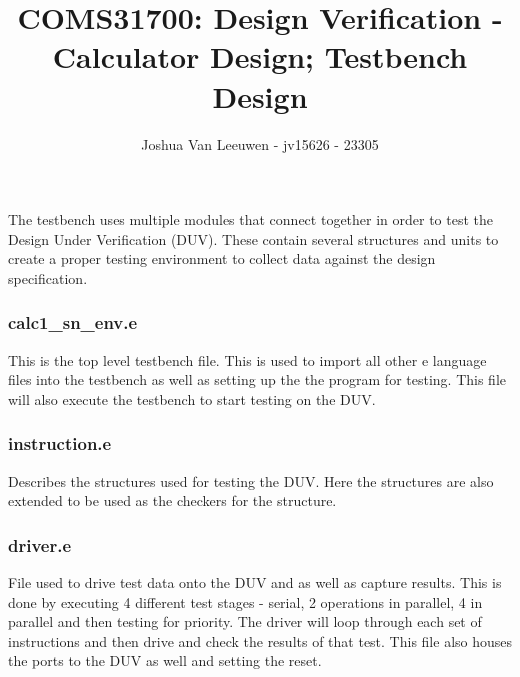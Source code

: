 \documentclass[a4paper]{article}
\title{\vspace{-0.7em}COMS31700: Design Verification - Calculator Design; Testbench Design\vspace{-0.7em}}
\author{Joshua Van Leeuwen - jv15626 - 23305}
\date{}
\begin{document}
\vspace{-10em}
\maketitle

\vspace{-4.1em}
The testbench uses multiple modules that connect together in order to test the
Design Under Verification (DUV). These contain several structures and units to
create a proper testing environment to collect data against the design
specification.


\subsubsection*{calc1\_sn\_env.e}
\vspace{-0.7em}
This is the top level testbench file. This is used to import all other e
language files into the testbench as well as setting up the the program for
testing. This file will also execute the testbench to start testing on the DUV.

\subsubsection*{instruction.e}
\vspace{-0.7em}
Describes the structures used for testing the DUV. Here the structures are also
extended to be used as the checkers for the structure.

\subsubsection*{driver.e}
\vspace{-0.7em}
File used to drive test data onto the DUV and as well as capture results.  This
is done by executing 4 different test stages - serial, 2 operations in
parallel, 4 in parallel and then testing for priority.  The driver will loop
through each set of instructions and then drive and check the results of that
test. This file also houses the ports to the DUV as well and setting the reset.
\end{document}
